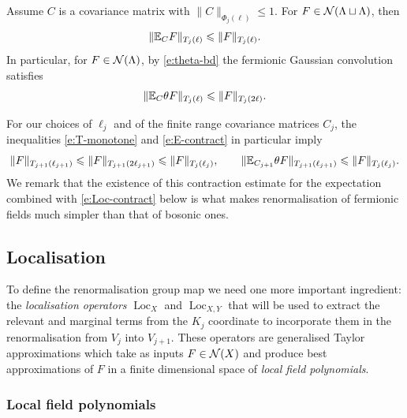 \documentclass[11pt]{amsart}
\numberwithin{equation}{section}
\numberwithin{theorem}{section}
\newcommand{\1}{{\bf 1}}
\newcommand{\Loc}{\operatorname{Loc}}
\begin{document}
\begin{proposition}
  Assume $C$ is a covariance matrix with
  $\|C\|_{\Phi_{j}(\ell)} \leq 1$.  For
  $F \in \mathcal N(\Lambda\sqcup\Lambda)$, then
  \begin{equation} \label{e:E-contract2}
    \|\mathbb{E}_{C}F\|_{T_j(\ell)} \leqslant \|F\|_{T_j(\ell)}.
  \end{equation}
  In particular, for $F\in\mathcal N(\Lambda)$, by \eqref{e:theta-bd} the fermionic Gaussian
  convolution satisfies
  \begin{equation} \label{e:E-contract}
    \|\mathbb{E}_{C} \theta F\|_{T_{j}(\ell)}
    \leqslant \|F\|_{T_{j}(2\ell)}.
  \end{equation}
\end{proposition}

For our choices of $\ell_j$ and of the finite range covariance matrices $C_j$,
the inequalities  \eqref{e:T-monotone} and \eqref{e:E-contract} in particular imply
\begin{equation} \label{e:normcontract}
  \|F\|_{T_{j+1}(\ell_{j+1})} \leqslant
  \|F\|_{T_{j+1}(2\ell_{j+1})} \leqslant \|F\|_{T_j(\ell_j)},
  \qquad
  \|\mathbb{E}_{C_{j+1}}\theta F\|_{T_{j+1}(\ell_{j+1})} \leqslant \|F\|_{T_j(\ell_j)}.
\end{equation}
We remark that the existence of this contraction estimate for the
expectation combined with \eqref{e:Loc-contract} below is what makes
renormalisation of fermionic fields much simpler than that of bosonic
ones.


\subsection{Localisation}
\label{sec:Loc}

To define the renormalisation group map we need one more
important ingredient: the \emph{localisation operators}
$\Loc_X$ and $\Loc_{X,Y}$ that will be used to extract the relevant and
marginal terms from the $K_j$ coordinate to incorporate them in the
renormalisation from $V_j$ into $V_{j+1}$. These operators are
generalised Taylor approximations which take as inputs $F\in \mathcal N(X)$
and produce best approximations of $F$ in a finite dimensional space
of \emph{local field polynomials}.

\subsubsection*{Local field polynomials}
\end{document}
